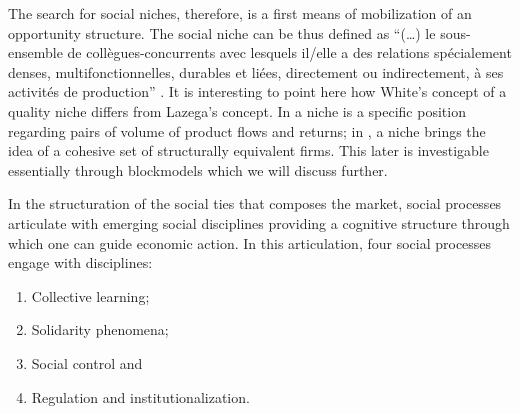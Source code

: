\documentclass[a4paper, 12pt, openright, oneside, german, french, brazil, english]{abntex2}
\begin{document}
	The search for social niches, therefore, is a first means of mobilization of an opportunity structure. The social niche can be thus defined as ``(\dots) le sous-ensemble de collègues-concurrents avec lesquels il/elle a des relations spécialement denses, multifonctionnelles, durables et liées, directement ou indirectement, à ses activités de production'' \cite[p. 575]{lazega2009theorie}. It is interesting to point here how White's concept of a quality niche differs from Lazega's concept. In  a niche is a specific position regarding pairs of volume of product flows and returns; in , a niche brings the idea of a cohesive set of structurally equivalent firms. This later is investigable essentially through blockmodels which we will discuss further.
	
	
	In the structuration of the social ties that composes the market, social processes  articulate with emerging social disciplines providing a cognitive structure through which one can guide economic action. In this articulation, four social processes engage with disciplines:
	
	\begin{enumerate}
		\item Collective learning;
		\item Solidarity phenomena;
		\item Social control and
		\item Regulation and institutionalization.
	\end{enumerate}
	
	
\end{document}
